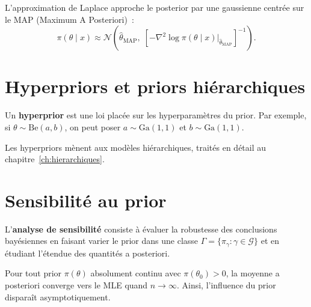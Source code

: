 \begin{definition}
L'approximation de Laplace approche le posterior par une gaussienne
centr\'ee sur le MAP (Maximum A Posteriori)~:
\[
  \pi(\theta \mid x) \approx \mathcal{N}\!\left(\hat{\theta}_{\text{MAP}},\;
  \left[-\nabla^2 \log \pi(\theta \mid x)\big|_{\hat{\theta}_{\text{MAP}}}\right]^{-1}\right).
\]
\end{definition}

\section{Hyperpriors et priors hi\'erarchiques}

\begin{definition}[Hyperprior]
Un \textbf{hyperprior} est une loi plac\'ee sur les hyperparam\`etres du
prior. Par exemple, si $\theta \sim \text{Be}(a, b)$, on peut poser
$a \sim \text{Ga}(1, 1)$ et $b \sim \text{Ga}(1, 1)$.
\end{definition}

\begin{remarque}
Les hyperpriors m\`enent aux mod\`eles hi\'erarchiques, trait\'es en
d\'etail au chapitre~\ref{ch:hierarchiques}.
\end{remarque}

\section{Sensibilit\'e au prior}

\begin{definition}
L'\textbf{analyse de sensibilit\'e} consiste \`a \'evaluer la robustesse
des conclusions bay\'esiennes en faisant varier le prior dans une classe
$\Gamma = \{\pi_\gamma : \gamma \in \mathcal{G}\}$ et en \'etudiant
l'\'etendue des quantit\'es a posteriori.
\end{definition}

\begin{proposition}
Pour tout prior $\pi(\theta)$ absolument continu avec
$\pi(\theta_0) > 0$, la moyenne a posteriori converge vers le MLE
quand $n \to \infty$. Ainsi, l'influence du prior dispara\^it
asymptotiquement.
\end{proposition}


